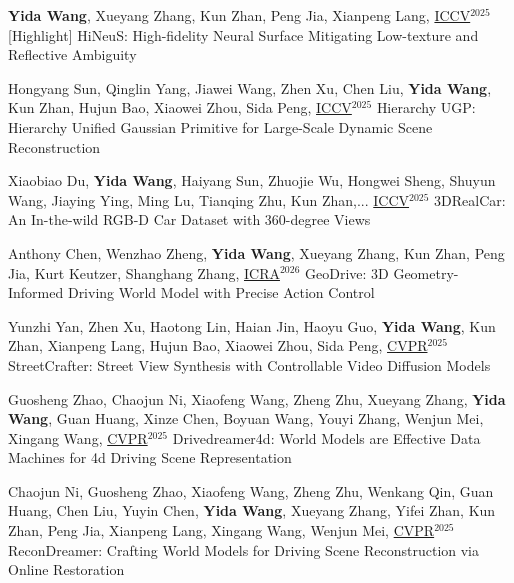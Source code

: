 \begin{cventries}
\begin{enumerate}[label={[\arabic*]}, leftmargin=*]
\item
\cvpublication
{\textbf{Yida Wang}, Xueyang Zhang, Kun Zhan, Peng Jia, Xianpeng Lang, \underline{ICCV}$^{2025}$ [Highlight]} %
{HiNeuS: High-fidelity Neural Surface Mitigating Low-texture and Reflective Ambiguity} %
{} %
{} %

\item 
\cvpublication
{Hongyang Sun, Qinglin Yang, Jiawei Wang, Zhen Xu, Chen Liu, \textbf{Yida Wang}, Kun Zhan, Hujun Bao, Xiaowei Zhou, Sida Peng, \underline{ICCV}$^{2025}$} %
{Hierarchy UGP: Hierarchy Unified Gaussian Primitive for Large-Scale Dynamic Scene Reconstruction} %
{} %
{} %

\item 
\cvpublication
{Xiaobiao Du, \textbf{Yida Wang}, Haiyang Sun, Zhuojie Wu, Hongwei Sheng, Shuyun Wang, Jiaying Ying, Ming Lu, Tianqing Zhu, Kun Zhan,...  \underline{ICCV}$^{2025}$} %
{3DRealCar: An In-the-wild RGB-D Car Dataset with 360-degree Views} %
{} %
{} %

\item 
\cvpublication
{Anthony Chen, Wenzhao Zheng, \textbf{Yida Wang}, Xueyang Zhang, Kun Zhan, Peng Jia, Kurt Keutzer, Shanghang Zhang, \underline{ICRA}$^{2026}$} %
{GeoDrive: 3D Geometry-Informed Driving World Model with Precise Action Control} %
{} %
{} %

\item 
\cvpublication
{Yunzhi Yan, Zhen Xu, Haotong Lin, Haian Jin, Haoyu Guo, \textbf{Yida Wang}, Kun Zhan, Xianpeng Lang, Hujun Bao, Xiaowei Zhou, Sida Peng, \underline{CVPR}$^{2025}$} %
{StreetCrafter: Street View Synthesis with Controllable Video Diffusion Models} %
{} %
{} %

\item 
\cvpublication
{Guosheng Zhao, Chaojun Ni, Xiaofeng Wang, Zheng Zhu, Xueyang Zhang, \textbf{Yida Wang}, Guan Huang, Xinze Chen, Boyuan Wang, Youyi Zhang, Wenjun Mei, Xingang Wang, \underline{CVPR}$^{2025}$} %
{Drivedreamer4d: World Models are Effective Data Machines for 4d Driving Scene Representation} %
{} %
{} %

\item 
\cvpublication
{Chaojun Ni, Guosheng Zhao, Xiaofeng Wang, Zheng Zhu, Wenkang Qin, Guan Huang, Chen Liu, Yuyin Chen, \textbf{Yida Wang}, Xueyang Zhang, Yifei Zhan, Kun Zhan, Peng Jia, Xianpeng Lang, Xingang Wang, Wenjun Mei, \underline{CVPR}$^{2025}$} %
{ReconDreamer: Crafting World Models for Driving Scene Reconstruction via Online Restoration} %
{} %
{} %


\end{enumerate}
\end{cventries}
